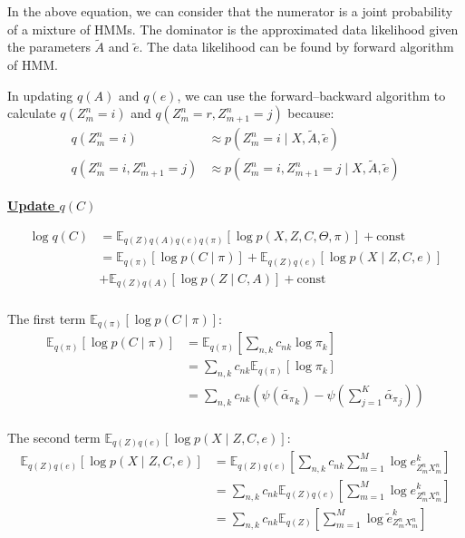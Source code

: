 \documentclass[12pt]{article}
\newenvironment{problem}[2][Problem]{\begin{trivlist}
\item[\hskip \labelsep {\bfseries #1}\hskip \labelsep {\bfseries #2.}]}{\end{trivlist}}
\begin{document}
\begin{problem}{2.8.24}
In the above equation, we can consider that the numerator is a joint probability of
a mixture of HMMs. The dominator is the approximated data likelihood given 
the parameters $\tilde{A}$ and $\tilde{e}$.
The data likelihood can be found by forward algorithm of HMM. 

In updating $q(A)$ and $q(e)$, we can use 
the forward–backward algorithm to calculate $q(Z^n_{m}=i)$ and $q(Z^n_{m}=r, Z^n_{m+1}=j)$
because:
\begin{align*}
    q(Z^n_{m}=i) &\approx p(Z^n_{m}=i \mid X, \tilde{A}, \tilde{e}) \\
    q(Z^n_{m}=i, Z^n_{m+1}=j) &\approx p(Z^n_{m}=i, Z^n_{m+1}=j\mid X, \tilde{A}, \tilde{e})
\end{align*}

\begin{flushleft}
    \textbf{\underline{Update $q(C)$}}
\end{flushleft}
\begin{align*}
    \log q(C) &= \mathbb{E}_{q(Z)q(A)q(e)q(\pi)}[\log p(X, Z, C, \Theta, \pi)] + \text{const} \\
    &= \mathbb{E}_{q(\pi)}[\log p(C \mid \pi)]
        + \mathbb{E}_{q(Z)q(e)}[\log p(X \mid Z, C, e)]  \\
        &+ \mathbb{E}_{q(Z)q(A)}[\log p(Z \mid C, A)] + \text{const} \\
\end{align*}

The first term $\mathbb{E}_{q(\pi)}[\log p(C \mid \pi)]$:
\begin{align*}
    \mathbb{E}_{q(\pi)}[\log p(C \mid \pi)] 
    &= \mathbb{E}_{q(\pi)}[\sum_{n,k} c_{nk} \log \pi_k] \\
    &= \sum_{n,k} c_{nk}\mathbb{E}_{q(\pi)}[\log \pi_k] \\
    &= \sum_{n,k} c_{nk}(\psi(\tilde{\alpha_\pi}_k) - \psi(\sum_{j=1}^{K}\tilde{\alpha_\pi}_j)) \\
\end{align*}

The second term $\mathbb{E}_{q(Z)q(e)}[\log p(X \mid Z, C, e)]$:
\begin{align*}
    \mathbb{E}_{q(Z)q(e)}[\log p(X \mid Z, C, e)]
    &= \mathbb{E}_{q(Z)q(e)}[\sum_{n,k}c_{nk}\sum_{m=1}^{M}\log e^k_{Z^n_m X^n_m}] \\
    &= \sum_{n,k}c_{nk}\mathbb{E}_{q(Z)q(e)}[\sum_{m=1}^{M}\log e^k_{Z^n_m X^n_m}] \\
    &= \sum_{n,k}c_{nk}\mathbb{E}_{q(Z)}[\sum_{m=1}^{M}\log \tilde{e}^k_{Z^n_m X^n_m}]
\end{align*}


\end{problem}
\end{document}
